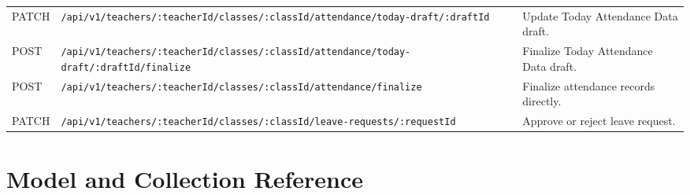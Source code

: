 \begin{longtable}{p{2cm} p{6.2cm} p{5.5cm}}
PATCH & \texttt{/api/v1/teachers/:teacherId/classes/:classId/attendance/today-draft/:draftId} & Update Today Attendance Data draft.\\
POST & \texttt{/api/v1/teachers/:teacherId/classes/:classId/attendance/today-draft/:draftId/finalize} & Finalize Today Attendance Data draft.\\
POST & \texttt{/api/v1/teachers/:teacherId/classes/:classId/attendance/finalize} & Finalize attendance records directly.\\
PATCH & \texttt{/api/v1/teachers/:teacherId/classes/:classId/leave-requests/:requestId} & Approve or reject leave request.\\
\bottomrule
\end{longtable}

\section{Model and Collection Reference}

